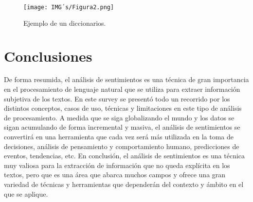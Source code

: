 \documentclass[12pt, conference]{IEEEtran}
\begin{document}
  \begin{figure}[htbp]
    \caption{Ejemplo de un diccionarios.}
    \centerline{\texttt{[image: IMG´s/Figura2.png]}}
    \label{fig2}
  \end{figure}

\section{Conclusiones}
De forma resumida, el análisis de sentimientos es una técnica de gran importancia en el procesamiento de lenguaje natural que se utiliza para extraer información subjetiva de los textos. En este survey se presentó todo un recorrido por los distintos conceptos, casos de uso, técnicas y limitaciones en este tipo de análisis de procesamiento.
A medida que se siga globalizando el mundo y los datos se sigan acumulando de forma incremental y masiva, el análisis de sentimientos se convertirá en una herramienta que cada vez será más utilizada en la toma de decisiones, análisis de pensamiento y comportamiento humano, predicciones de eventos, tendencias, etc.
En conclusión, el análisis de sentimientos es una técnica muy valiosa para la extracción de información que no queda explícita en los textos, pero que es una área que abarca muchos campos y ofrece una gran variedad de técnicas y herramientas que dependerán del contexto y ámbito en el que se aplique.
\end{document}
